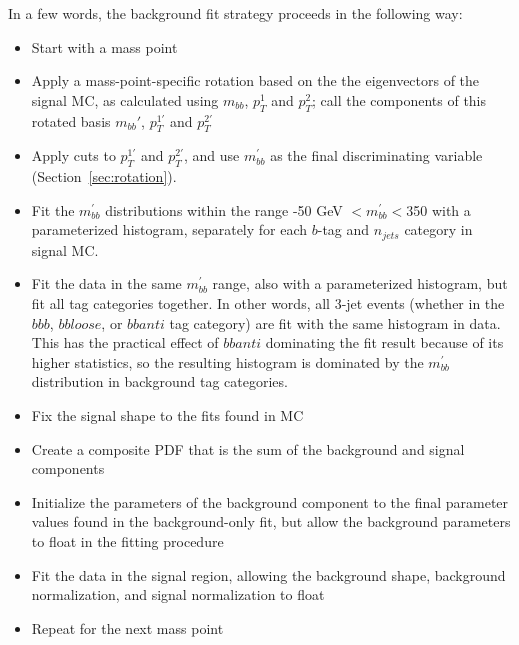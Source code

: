 In a few words, the background fit strategy proceeds in the following way:
\begin{itemize}
    \item Start with a mass point
    \item Apply a mass-point-specific rotation based on the the eigenvectors of 
    the signal MC, as calculated using $m_{bb}$, $p_{T}^1$ and $p_T^2$; call 
    the components of this rotated basis $m_{bb}'$, $p_T^{1'}$ and $p_T^{2'}$
    \item Apply cuts to $p_T^{1'}$ and $p_T^{2'}$, and use $m_{bb}^{'}$ as the final 
    discriminating variable (Section~\ref{sec:rotation}). 
    \item Fit the $m_{bb}^{'}$ distributions within the range -50 GeV $<m_{bb}^{'}<$350
    with a parameterized histogram, separately for each $b$-tag and $n_{jets}$ category
    in signal MC.
    \item Fit the data in the same $m_{bb}^{'}$ range, also with a parameterized histogram,
    but fit all tag categories together.  In other words, all 3-jet events (whether in the
    $bbb$, $bbloose$, or $bbanti$ tag category) are fit with the same histogram in data.
    This has the practical effect of $bbanti$ dominating the fit result because of its
    higher statistics, so the resulting
    histogram is dominated by the $m_{bb}^{'}$ distribution in background tag categories.
    \item Fix the signal shape to the fits found in MC
    \item Create a composite PDF that is the sum of the background and signal components
    \item Initialize the parameters of the background component to the final parameter values
    found in the background-only fit, but allow the background parameters to float in 
    the fitting procedure
    \item Fit the data in the signal region, allowing the background shape, background
    normalization, and signal normalization to float
    \item Repeat for the next mass point
\end{itemize}

